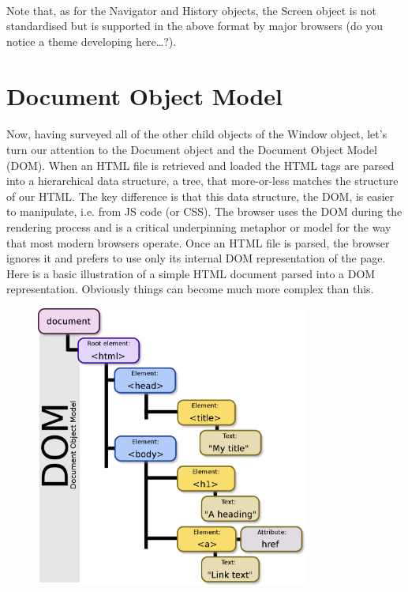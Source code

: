 \paragraph{} Note that, as for the Navigator and History objects, the Screen object is not standardised but is supported in the above format by major browsers (do you notice a theme developing here\ldots?).


\section{Document Object Model}
\paragraph{} Now, having surveyed all of the other child objects of the Window object, let's turn our attention to the Document object and the Document Object Model (DOM). When an HTML file is retrieved and loaded the HTML tags are parsed into a hierarchical data structure, a tree, that more-or-less matches the structure of our HTML. The key difference is that this data structure, the DOM, is easier to manipulate, i.e. from JS code (or CSS). The browser uses the DOM during the rendering process and is a critical underpinning metaphor or model for the way that most modern browsers operate. Once an HTML file is parsed, the browser ignores it and prefers to use only its internal DOM representation of the page. Here is a basic illustration of a simple HTML document parsed into a DOM representation. Obviously things can become much more complex than this.


\begin{figure}[H]
\centering
\includegraphics[width=0.8\textwidth]{figures/dom}
\label{fig:dom}
\caption{}
\end{figure}

